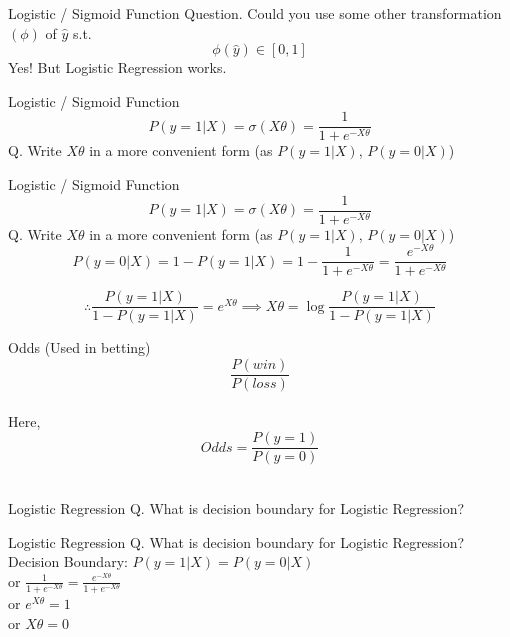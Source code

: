 \documentclass{beamer}
\begin{document}
\begin{frame}{Logistic / Sigmoid Function}
Question. Could you use some other transformation $(\phi)$ of $\hat{y}$ s.t. \\
\begin{equation*}
\phi(\hat{y}) \in [0, 1]
\end{equation*}
Yes! But Logistic Regression works.
\end{frame}
\begin{frame}{Logistic / Sigmoid Function}
\begin{equation*}
P(y = 1 | X) = \sigma(X\theta) = \frac{1}{1 + e^{-X\theta}}    
\end{equation*}
Q. Write $X\theta$ in a more convenient form (as $P(y = 1|X)$, $P(y = 0 | X)$)\\
\end{frame}
\begin{frame}{Logistic / Sigmoid Function}
\begin{equation*}
P(y = 1 | X) = \sigma(X\theta) = \frac{1}{1 + e^{-X\theta}}    
\end{equation*}
Q. Write $X\theta$ in a more convenient form (as $P(y = 1|X)$, $P(y = 0 | X)$)\\
\pause \begin{equation*}
P(y = 0 | X) = 1 - P(y = 1 | X) = 1 - \frac{1}{1 + e^{-X\theta}} = \frac{e^{-X\theta}}{1 + e^{-X\theta}} 
\end{equation*}

\pause \begin{equation*}
\therefore \frac{P(y = 1|X)}{1 - P(y = 1|X)} = e^{X\theta}
\implies X\theta = \log\frac{P(y = 1|X)}{1 - P(y = 1 | X)}
\end{equation*}
\end{frame}
\begin{frame}{Odds (Used in betting)}
$$\frac{P(win)}{P(loss)}$$ \\
\hspace{3cm} Here,\\
$$Odds = \frac{P(y = 1)}{P(y = 0)}$$ \\
\centering
{}
\end{frame}
\begin{frame}{Logistic Regression}
Q. What is decision boundary for Logistic Regression?
\end{frame}
\begin{frame}{Logistic Regression}
Q. What is decision boundary for Logistic Regression? \\
\hspace{0.4cm} Decision Boundary: $P(y = 1|X) = P(y = 0 | X)$\\
\vspace{0.3cm}
\hspace{4cm} or $\frac{1}{1 + e^{-X\theta}} = \frac{e^{-X\theta}}{1 + e^{-X\theta}}$  \\
\vspace{0.3cm}
\hspace{4cm} or $e^{X\theta} = 1$\\
\vspace{0.3cm}
\hspace{4cm} or $X\theta = 0$
\end{frame}
\end{document}
